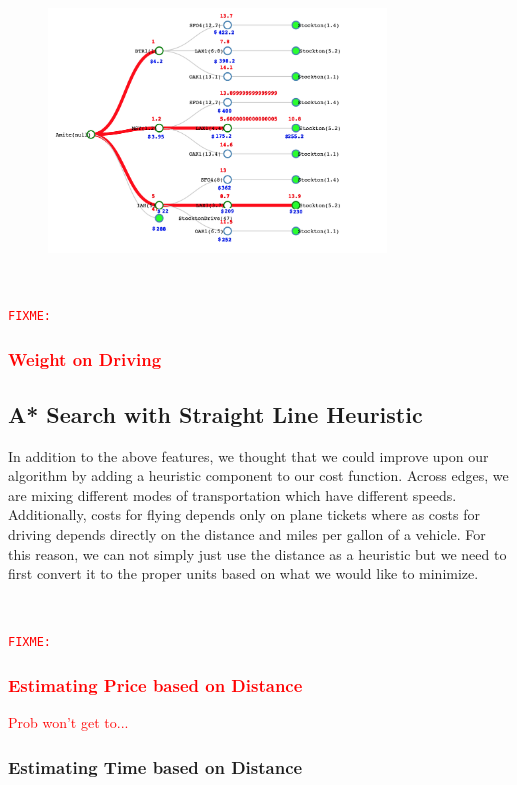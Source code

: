 \documentclass[11pt]{article}
\newcommand{\FIXME}[1]{ \ \\ \hspace* {-1.5 cm}
  \textcolor{red}{\texttt{FIXME:}#1} \medskip\par}
\begin{document}
\begin{figure}[!ht]
  \centering
  \includegraphics[width=0.8\textwidth]{time_lim}
  \label{fig:time_lim}
\end{figure}


\FIXME{\subsubsection{Weight on Driving}}

\subsection{A* Search with Straight Line Heuristic}

In addition to the above features, we thought that we could improve upon our algorithm by adding a heuristic component to our cost function. 
Across edges, we are mixing different modes of transportation which have different speeds. Additionally, costs for flying depends only on plane tickets where as costs for driving depends directly on the distance and miles per gallon of a vehicle. 
For this reason, we can not simply just use the distance as a heuristic but we need to first convert it to the proper units based on what we would like to minimize.

\FIXME{\subsubsection{Estimating Price based on Distance} Prob won't get to...}

\subsubsection{Estimating Time based on Distance}
\end{document}
